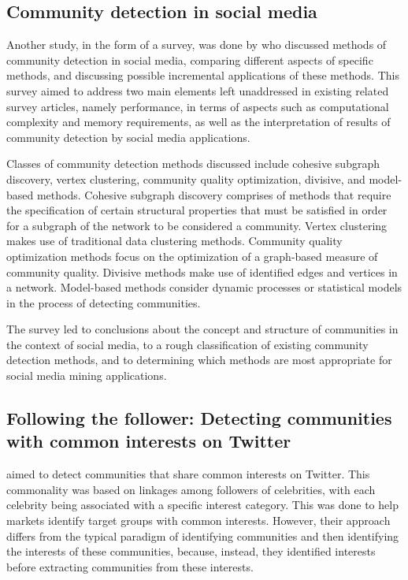 \subsection{Community detection in social media}


Another study, in the form of a survey, was done by  who discussed methods of community detection in social media, comparing different aspects of specific methods, and discussing possible incremental applications of these methods. This survey aimed to address two main elements left unaddressed in existing related survey articles, namely performance, in terms of aspects such as computational complexity and memory requirements, as well as the interpretation of results of community detection by social media applications.


Classes of community detection methods discussed include cohesive subgraph discovery, vertex clustering, community quality optimization, divisive, and model-based methods. Cohesive subgraph discovery comprises of methods that require the specification of certain structural properties that must be satisfied in order for a subgraph of the network to be considered a community. Vertex clustering makes use of traditional data clustering methods. Community quality optimization methods focus on the optimization of a graph-based measure of community quality. Divisive methods make use of identified edges and vertices in a network. Model-based methods consider dynamic processes or statistical models in the process of detecting communities.


The survey led to conclusions about the concept and structure of communities in the context of social media, to a rough classification of existing community detection methods, and to determining which methods are most appropriate for social media mining applications.


\subsection{Following the follower: Detecting communities with common interests on Twitter}


 aimed to detect communities that share common interests on Twitter. This commonality was based on linkages among followers of celebrities, with each celebrity being associated with a specific interest category. This was done to help markets identify target groups with common interests. However, their approach differs from the typical paradigm of identifying communities and then identifying the interests of these communities, because, instead, they identified interests before extracting communities from these interests.


